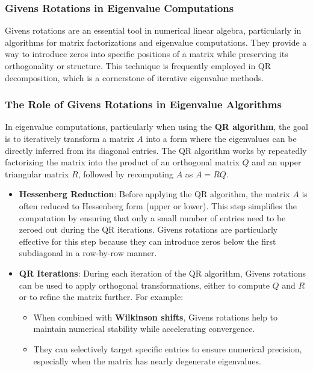 \documentclass[12pt]{article}
\numberwithin{equation}{subsubsection}
\begin{document}
\subsubsection{Givens Rotations in Eigenvalue Computations}

Givens rotations are an essential tool in numerical linear algebra, particularly in algorithms for matrix factorizations and eigenvalue computations. They provide a way to introduce zeros into specific positions of a matrix while preserving its orthogonality or structure. This technique is frequently employed in QR decomposition, which is a cornerstone of iterative eigenvalue methods.

\subsubsection{The Role of Givens Rotations in Eigenvalue Algorithms}

In eigenvalue computations, particularly when using the \textbf{QR algorithm}, the goal is to iteratively transform a matrix $ A $ into a form where the eigenvalues can be directly inferred from its diagonal entries. The QR algorithm works by repeatedly factorizing the matrix into the product of an orthogonal matrix $ Q $ and an upper triangular matrix $ R $, followed by recomputing $ A $ as $ A = RQ $.

\begin{itemize}
	\item \textbf{Hessenberg Reduction}: 
	      Before applying the QR algorithm, the matrix $ A $ is often reduced to Hessenberg form (upper or lower). This step simplifies the computation by ensuring that only a small number of entries need to be zeroed out during the QR iterations. Givens rotations are particularly effective for this step because they can introduce zeros below the first subdiagonal in a row-by-row manner.
	      
	\item \textbf{QR Iterations}: 
	      During each iteration of the QR algorithm, Givens rotations can be used to apply orthogonal transformations, either to compute $ Q $ and $ R $ or to refine the matrix further. For example:
	      \begin{itemize}
	      	\item When combined with \textbf{Wilkinson shifts}, Givens rotations help to maintain numerical stability while accelerating convergence.
	      	\item They can selectively target specific entries to ensure numerical precision, especially when the matrix has nearly degenerate eigenvalues.
	      \end{itemize}
\end{itemize}
\end{document}
